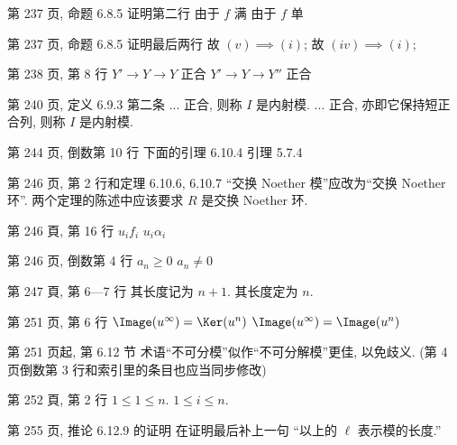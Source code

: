 \documentclass{AJerrata}
\begin{document}
\begin{Errata}
        \item[第 237 页, 命题 6.8.5 证明第二行]
        \Orig 由于 $f$ 满
        \Corr 由于 $f$ 单
        
        \item[第 237 页, 命题 6.8.5 证明最后两行]
        \Orig 故 $(v) \implies (i)$;
        \Corr 故 $(iv) \implies (i)$;
        
        \item[第 238 页, 第 8 行]
        \Orig $Y' \to Y \to Y$ 正合
        \Corr $Y' \to Y \to Y''$ 正合
        
       \item[第 240 页, 定义 6.9.3 第二条]
       \Orig ... 正合, 则称 $I$ 是内射模.
       \Corr ... 正合, 亦即它保持短正合列, 则称 $I$ 是内射模.
        
   		\item[第 244 页, 倒数第 10 行]
        \Orig 下面的引理 6.10.4
        \Corr 引理 5.7.4
        
   		\item[第 246 页, 第 2 行和定理 6.10.6, 6.10.7]
		``交换 Noether 模''应改为``交换 Noether 环''. 两个定理的陈述中应该要求 $R$ 是交换 Noether 环.
        
        \item[第 246 頁, 第 16 行]
        \Orig $u_i f_i$
        \Corr $u_i \alpha_i$

		\item[第 246 页, 倒数第 4 行]
		\Orig $a_n \geq 0$
		\Corr $a_n \neq 0$

        \item[第 247 頁, 第 6---7 行]
        \Orig 其长度记为 $n+1$.
        \Corr 其长度定为 $n$.

		\item[第 251 页, 第 6 行]
		\Orig $\Image(u^\infty) = \Ker(u^n)$
		\Corr $\Image(u^\infty) = \Image(u^n)$

  		\item[第 251 页起, 第 6.12 节]
		术语``不可分模''似作``不可分解模''更佳, 以免歧义. (第 4 页倒数第 3 行和索引里的条目也应当同步修改)

        \item[第 252 頁, 第 2 行]
        \Orig $1 \leq 1 \leq n$.
        \Corr $1 \leq i \leq n$.
        
        \item[第 255 页, 推论 6.12.9 的证明]
        在证明最后补上一句 ``以上的 $\ell$ 表示模的长度.''


\end{Errata}
\end{document}
